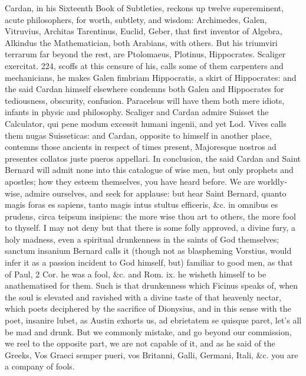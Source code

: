 {Cardan, in his Sixteenth Book of Subtleties, reckons up twelve
supereminent, acute philosophers, for worth, subtlety, and wisdom:
Archimedes, Galen, Vitruvius, Architas Tarentinus, Euclid, Geber, that
first inventor of Algebra, Alkindus the Mathematician, both Arabians,
with others. But his triumviri terrarum far beyond the rest, are
Ptolomaeus, Plotinus, Hippocrates. Scaliger exercitat. 224, scoffs at
this censure of his, calls some of them carpenters and mechanicians, he
makes Galen fimbriam Hippocratis, a skirt of Hippocrates: and the said
Cardan himself elsewhere condemns both Galen and Hippocrates for
tediousness, obscurity, confusion. Paracelsus will have them both mere
idiots, infants in physic and philosophy. Scaliger and Cardan admire
Suisset the Calculator, qui pene modum excessit humani ingenii, and yet
Lod. Vives calls them nugas Suisseticas: and Cardan, opposite to
himself in another place, contemns those ancients in respect of times
present, Majoresque nostros ad presentes collatos juste pueros
appellari. In conclusion, the said Cardan and Saint Bernard will
admit none into this catalogue of wise men, but only prophets and
apostles; how they esteem themselves, you have heard before. We are
worldly-wise, admire ourselves, and seek for applause: but hear Saint
Bernard, quanto magis foras es sapiens, tanto magis intus stultus
efficeris, \&c. in omnibus es prudens, circa teipsum insipiens: the more
wise thou art to others, the more fool to thyself. I may not deny but
that there is some folly approved, a divine fury, a holy madness, even
a spiritual drunkenness in the saints of God themselves; sanctum
insanium Bernard calls it (though not as blaspheming Vorstius,
would infer it as a passion incident to God himself, but) familiar to
good men, as that of Paul, 2 Cor. he was a fool, \&c. and Rom. ix. he
wisheth himself to be anathematised for them. Such is that drunkenness
which Ficinus speaks of, when the soul is elevated and ravished with a
divine taste of that heavenly nectar, which poets deciphered by the
sacrifice of Dionysius, and in this sense with the poet, insanire
lubet, as Austin exhorts us, ad ebrietatem se quisque paret, let's all
be mad and drunk. But we commonly mistake, and go beyond our
commission, we reel to the opposite part, we are not capable of
it, and as he said of the Greeks, Vos Graeci semper pueri, vos
Britanni, Galli, Germani, Itali, \&c. you are a company of fools.

}

